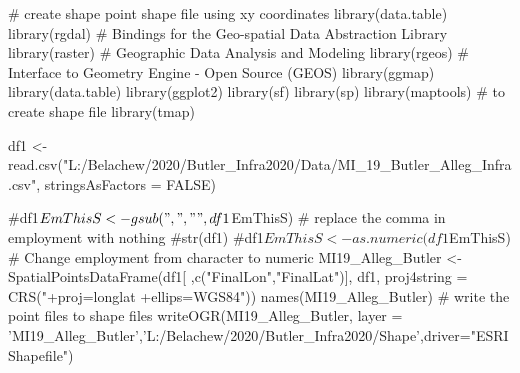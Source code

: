 # create shape point shape file using xy coordinates
library(data.table)
library(rgdal) # Bindings for the Geo-spatial Data Abstraction Library
library(raster) # Geographic Data Analysis and Modeling
library(rgeos) # Interface to Geometry Engine - Open Source (GEOS)
library(ggmap)
library(data.table)
library(ggplot2)
library(sf)
library(sp)
library(maptools) # to create shape file
library(tmap)

df1 <- read.csv("L:/Belachew/2020/Butler_Infra2020/Data/MI_19_Butler_Alleg_Infra.csv", stringsAsFactors = FALSE)


                 
#df1$EmThisS <- gsub(",", "",df1$EmThisS) # replace the comma in employment with nothing
#str(df1)
#df1$EmThisS <- as.numeric(df1$EmThisS) # Change employment from character to numeric
MI19_Alleg_Butler <- SpatialPointsDataFrame(df1[ ,c("FinalLon","FinalLat")], df1,
                                   proj4string = CRS("+proj=longlat +ellips=WGS84"))
names(MI19_Alleg_Butler)
# write the point files to shape files
writeOGR(MI19_Alleg_Butler, layer = 'MI19_Alleg_Butler','L:/Belachew/2020/Butler_Infra2020/Shape',driver="ESRI Shapefile")
